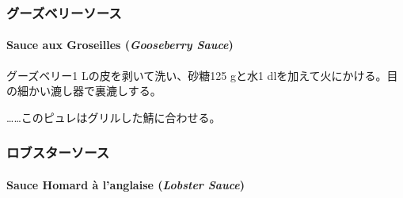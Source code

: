 \begin{recette}
\maeaki

\hypertarget{ux30b0ux30fcux30baux30d9ux30eaux30fcux30bdux30fcux30b9}{%
\subsubsection{グーズベリーソース}\label{ux30b0ux30fcux30baux30d9ux30eaux30fcux30bdux30fcux30b9}}

\hypertarget{gooseberry-sauce}{%
\paragraph{\texorpdfstring{Sauce aux Groseilles (\emph{Gooseberry
Sauce})}{Sauce aux Groseilles (Gooseberry Sauce)}}\label{gooseberry-sauce}}


グーズベリー1 Lの皮を剥いて洗い、砂糖125 gと水1
dlを加えて火にかける。目の細かい漉し器で裏漉しする。

\ldots{}\ldots{}このピュレはグリルした鯖に合わせる。

\maeaki

\hypertarget{ux30edux30d6ux30b9ux30bfux30fcux30bdux30fcux30b9}{%
\subsubsection{ロブスターソース}\label{ux30edux30d6ux30b9ux30bfux30fcux30bdux30fcux30b9}}

\hypertarget{lobster-sauce}{%
\paragraph{\texorpdfstring{Sauce Homard à l'anglaise (\emph{Lobster
Sauce})}{Sauce Homard à l'anglaise (Lobster Sauce)}}\label{lobster-sauce}}


\end{recette}
